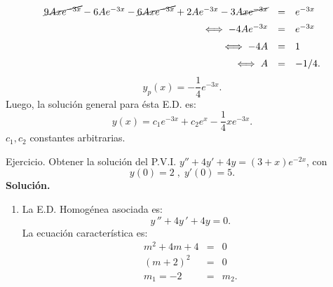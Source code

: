 \documentclass[9pt]{beamer}
\begin{document}
\begin{frame}[t]
	\begin{exampleblock}{}
		\[
			\begin{array}{rcl}
				\cancel{9Axe^{-3x}} - 6Ae^{-3x} - \cancel{6Axe^{-3x}} +2Ae^{-3x} - 3A \cancel{xe^{-3x}} & = & e^{-3x} \\[2mm]
				\iff -4Ae^{-3x} & = & e^{-3x} \\[2mm]
				\iff -4A & = & 1 \\[2mm]
				\iff A & = & -1/4.
			\end{array}
		\]
		\[
			y_p(x) = - \dfrac{1}{4} e^{-3x}.
		\]
		Luego, la solución general para ésta E.D. es:
		\[
			y(x) = c_1e^{-3x} + c_2e^x- \dfrac{1}{4} xe^{-3x}.
		\]
		\(c_1,c_2\) constantes arbitrarias.
	\end{exampleblock}
\end{frame}

\begin{frame}[t]
	\begin{alertblock}{Ejercicio.}
		Obtener la solución del P.V.I. \(y'' +4y' +4y=(3+x) e^{-2x}\), con
		\[
			y(0) = 2 \;,\; y' (0) =5.
		\]
		\textbf{Solución.}
		\begin{enumerate}
			\item La E.D. Homogénea asociada es:
				\[
					y\,'' +4y\,' +4y =0.
				\]
				La ecuación característica es:
				\[
					\begin{array}{rcl}
						m^2+4m+4 & = & 0 \\[2mm]
						(m+2) ^2 & = & 0 \\[2mm]
						m_1 = -2 & = & m_2.
					\end{array}
				\]
		\end{enumerate}
	\end{alertblock}
\end{frame}
\end{document}
